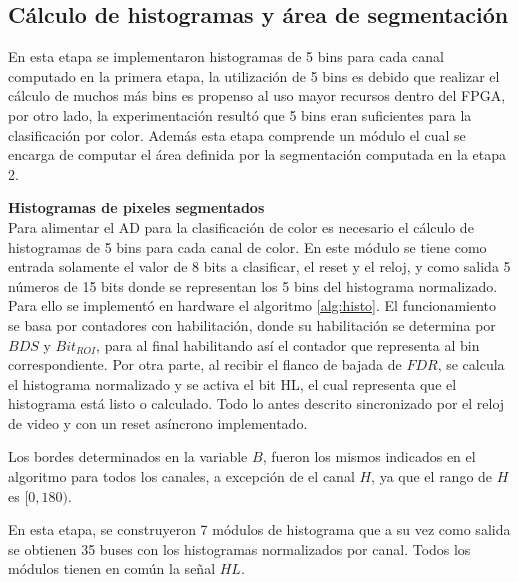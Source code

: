 \documentclass[twoside,spanish,ESP,MSc]{plantillaLabUPV}
\theoremstyle{definition}
\begin{document}
\subsection{Cálculo de histogramas y área de segmentación}
En esta etapa se implementaron histogramas de 5 bins para cada canal computado en la primera etapa, la utilización de 5 bins es debido que realizar el cálculo de muchos más bins es propenso al uso mayor recursos dentro del FPGA, por otro lado, la experimentación resultó que 5 bins eran suficientes para la clasificación por color. Además esta etapa comprende un módulo el cual se encarga de computar el área definida por la segmentación computada en la etapa 2.

\checkmark\textbf{Histogramas de pixeles segmentados}\\ \label{sec:histo}
Para alimentar el AD para la clasificación de color es necesario el cálculo de histogramas de 5 bins para cada canal de color. En este módulo se tiene como entrada solamente el valor de 8 bits a clasificar, el reset y el reloj, y como salida 5 números de 15 bits donde se representan los 5 bins del histograma normalizado. Para ello se implementó en hardware el algoritmo \ref{alg:histo}. El funcionamiento se basa por contadores con habilitación, donde su habilitación se determina por $BDS$ y $Bit_{ROI}$, para al final habilitando así el contador que representa al bin correspondiente. Por otra parte, al recibir el flanco de bajada de $FDR$, se calcula el histograma normalizado y se activa el bit HL, el cual representa que el histograma está listo o calculado. Todo lo antes descrito sincronizado por el reloj de video y con un reset asíncrono implementado.

Los bordes determinados en la variable $B$, fueron los mismos indicados en el algoritmo para todos los canales, a excepción de el canal $H$, ya que el rango de $H$ es $[0,180)$.

En esta etapa, se construyeron 7 módulos de histograma que a su vez como salida se obtienen 35 buses con los histogramas normalizados por canal. Todos los módulos tienen en común la señal $HL$.
\end{document}
